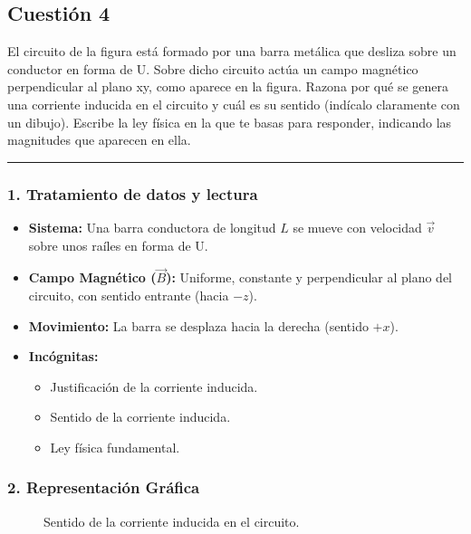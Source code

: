 \newpage

\subsection{Cuestión 4}
\label{subsec:C4_2022_jul_ord}

\begin{cajaenunciado}
El circuito de la figura está formado por una barra metálica que desliza sobre un conductor en forma de U. Sobre dicho circuito actúa un campo magnético perpendicular al plano xy, como aparece en la figura. Razona por qué se genera una corriente inducida en el circuito y cuál es su sentido (indícalo claramente con un dibujo). Escribe la ley física en la que te basas para responder, indicando las magnitudes que aparecen en ella.
\end{cajaenunciado}
\hrule

\subsubsection*{1. Tratamiento de datos y lectura}
\begin{itemize}
    \item \textbf{Sistema:} Una barra conductora de longitud $L$ se mueve con velocidad $\vec{v}$ sobre unos raíles en forma de U.
    \item \textbf{Campo Magnético ($\vec{B}$):} Uniforme, constante y perpendicular al plano del circuito, con sentido entrante (hacia $-z$).
    \item \textbf{Movimiento:} La barra se desplaza hacia la derecha (sentido $+x$).
    \item \textbf{Incógnitas:}
    \begin{itemize}
        \item Justificación de la corriente inducida.
        \item Sentido de la corriente inducida.
        \item Ley física fundamental.
    \end{itemize}
\end{itemize}

\subsubsection*{2. Representación Gráfica}
\begin{figure}[H]
    \centering
    \caption{Sentido de la corriente inducida en el circuito.}
\end{figure}

